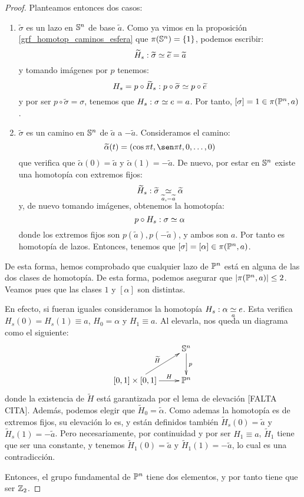 \begin{theo}
\begin{proof}
		Planteamos entonces dos casos:
		\begin{enumerate}[label=\roman*]
			\item $\widetilde{\sigma}$ es un lazo en $\Sfe^n$ de base $\widetilde{a}$. Como ya vimos en la proposición \ref{grf_homotop_caminos_esfera} que $\pi(\Sfe^n)=\{1\}$, podemos escribir:
			\[\widetilde{H}_s:\widetilde{\sigma}\homot\widetilde{e}=\widetilde{a}\]
			y tomando imágenes por $p$ tenemos:
			\[H_s=p\circ\widetilde{H}_s:p\circ\widetilde{\sigma}\homot p\circ\widetilde{e}\]
			y por ser $p\circ\widetilde{\sigma}=\sigma$, tenemos que $H_s: \sigma\homot e=a$. Por tanto, $[\sigma] = 1\in\pi(\proy^n,a)$.
			
			\item $\widetilde{\sigma}$ es un camino en $\Sfe^n$ de $\widetilde{a}$ a $-\widetilde{a}$. Consideramos el camino:
			\[\widetilde{\alpha}(t)= (\cos\pi t, \sen\pi t,0,\dots, 0) \]
			que verifica que $\widetilde{\alpha}(0)=\widetilde{a}$ y $\widetilde{\alpha}(1)=-\widetilde{a}$. De nuevo, por estar en $\Sfe^n$ existe una homotopía con extremos fijos:
			\[\widetilde{H}_s:\widetilde{\sigma}\homot[\widetilde{a},-\widetilde{a}]\widetilde{\alpha}\]
			y, de nuevo tomando imágenes, obtenemos la homotopía:
			\[p\circ H_s:\sigma\homot\alpha\]
			donde los extremos fijos son $p(\widetilde{a}),p(-\widetilde{a})$, y ambos son $a$. Por tanto es homotopía de lazos. Entonces, tenemos que $[\sigma] = [\alpha]\in\pi(\proy^n,a)$.
		\end{enumerate}
		
		De esta forma, hemos comprobado que cualquier lazo de $\proy^n$ está en alguna de las dos clases de homotopía. De esta forma, podemos asegurar que $\card{\pi(\proy^n,a)}\leq 2$. Veamos pues que las clases $1$ y $[\alpha]$ son distintas.
		
		En efecto, si fueran iguales consideramos la homotopía $H_s:\alpha\homot[a] e$. Esta verifica $H_s(0)=H_s(1)\equiv a$, $H_0=\alpha$ y $H_1\equiv a$. Al elevarla, nos queda un diagrama como el siguiente:
		\[\xymatrix{
			& \Sfe^n \ar[d]^p \\
			[0,1]\times[0,1] \ar[r]^-H \ar[ru]^{\widetilde{H}} & \proy^n
		}\]
		donde la existencia de $\widetilde{H}$ está garantizada por el lema de elevación [FALTA CITA]. Además, podemos elegir que $\widetilde{H}_0=\widetilde{\alpha}$. Como ademas la homotopía es de extremos fijos, su elevación lo es, y están definidos también $\widetilde{H}_s(0) = \widetilde{a}$ y $\widetilde{H}_s(1) = -\widetilde{a}$. Pero necesariamente, por continuidad y por ser $H_1\equiv a$, $\widetilde{H}_1$ tiene que ser una constante, y tenemos $\widetilde{H}_1(0) = \widetilde{a}$ y $\widetilde{H}_1(1)=-\widetilde{a}$, lo cual es una contradicción. %
		
		Entonces, el grupo fundamental de $\proy^n$ tiene dos elementos, y por tanto tiene que ser $\Z_2$.
	\end{proof}
\end{theo}

